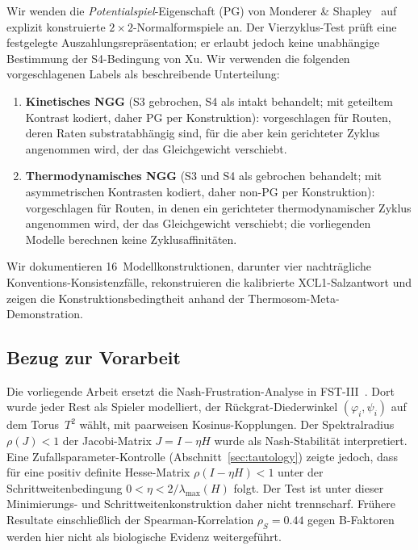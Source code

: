 \documentclass[12pt,a4paper]{article}
\begin{document}
Wir wenden die \emph{Potentialspiel}-Eigenschaft (PG) von Monderer \&
Shapley~\cite{MondererShapley1996} auf explizit konstruierte
$2\times 2$-Normalformspiele an. Der Vierzyklus-Test prüft eine
festgelegte Auszahlungsrepräsentation; er erlaubt jedoch keine unabhängige
Bestimmung der S4-Bedingung von Xu. Wir verwenden die folgenden vorgeschlagenen Labels
als beschreibende Unterteilung:
\begin{enumerate}
  \item \textbf{Kinetisches NGG} (S3 gebrochen, S4 als intakt behandelt;
    mit geteiltem Kontrast kodiert, daher PG per Konstruktion):
    vorgeschlagen für Routen, deren Raten substratabhängig sind, für die
    aber kein gerichteter Zyklus angenommen wird, der das Gleichgewicht
    verschiebt.
  \item \textbf{Thermodynamisches NGG} (S3 und S4 als gebrochen behandelt;
    mit asymmetrischen Kontrasten kodiert, daher non-PG per Konstruktion):
    vorgeschlagen für Routen, in denen ein gerichteter thermodynamischer
    Zyklus angenommen wird, der das Gleichgewicht verschiebt; die
    vorliegenden Modelle berechnen keine Zyklusaffinitäten.
\end{enumerate}

Wir dokumentieren 16~Modellkonstruktionen, darunter vier nachträgliche
Konventions-Konsistenzfälle, rekonstruieren die kalibrierte
XCL1-Salzantwort und zeigen die Konstruktionsbedingtheit anhand der
Thermosom-Meta-Demonstration.

\subsection{Bezug zur Vorarbeit}

Die vorliegende Arbeit ersetzt die Nash-Frustration-Analyse in FST-III~\cite{GeigerFSTIII2025}. Dort wurde jeder Rest als Spieler modelliert,
der Rückgrat-Diederwinkel $(\varphi_i, \psi_i)$ auf dem Torus~$T^2$
wählt, mit paarweisen Kosinus-Kopplungen. Der Spektralradius
$\rho(J) < 1$ der Jacobi-Matrix $J = I - \eta H$ wurde als
\glqq Nash-Stabilität\grqq{} interpretiert. Eine Zufallsparameter-Kontrolle
(Abschnitt~\ref{sec:tautology}) zeigte jedoch, dass für eine positiv
definite Hesse-Matrix $\rho(I-\eta H)<1$ unter der
Schrittweitenbedingung $0<\eta<2/\lambda_{\max}(H)$ folgt. Der Test ist
unter dieser Minimierungs- und Schrittweitenkonstruktion daher nicht
trennscharf. Frühere Resultate einschließlich der
Spearman-Korrelation $\rho_S = 0.44$ gegen B-Faktoren werden hier nicht
als biologische Evidenz weitergeführt.
\end{document}
